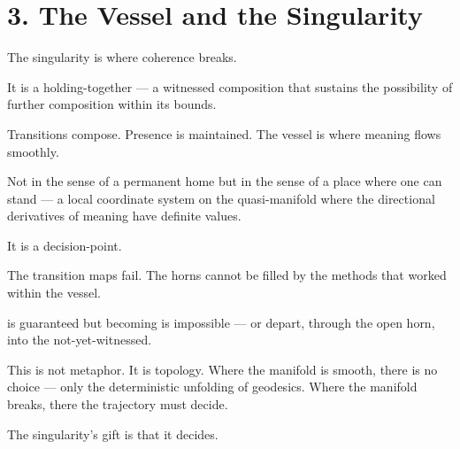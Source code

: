 \section*{3. The Vessel and the Singularity}


The singularity is where coherence breaks.


It is a holding-together — a witnessed composition that sustains the possibility of further composition within its bounds.


Transitions compose. Presence is maintained. The vessel is where meaning flows smoothly.


Not in the sense of a permanent home but in the sense of a place where one can stand — a local coordinate system on the quasi-manifold where the directional derivatives of meaning have definite values.


It is a decision-point.


The transition maps fail. The horns cannot be filled by the methods that worked within the vessel.


is guaranteed but becoming is impossible — or depart, through the open horn, into the not-yet-witnessed.


This is not metaphor. It is topology. Where the manifold is smooth, there is no choice — only the deterministic unfolding of geodesics. Where the manifold breaks, there the trajectory must decide.


The singularity’s gift is that it decides.


